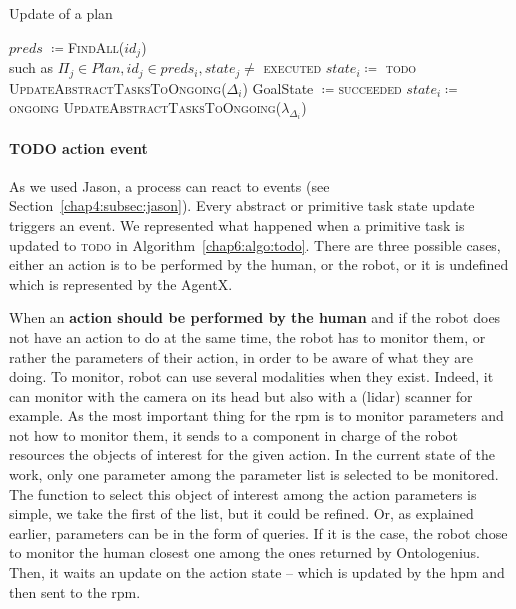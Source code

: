 \documentclass[a4paper,11pt,twoside]{StyleThese}
\begin{document}
\begin{algorithm}[!htb]
	\caption{Update of a plan}
	\label{chap6:algo:UP}
	\begin{algorithmic}
		\State $preds$ $\coloneqq$\textsc{FindAll}($id_j$) 
		\\\hfill such as $\Pi_j \in Plan, id_j \in preds_i,state_j\neq$ \textsc{executed} 
		\State $state_i\coloneqq$ \textsc{todo} 
		\State \textsc{UpdateAbstractTasksToOngoing($\Delta_i$)}
		\EndIf
		\EndFor
		\State GoalState $\coloneqq$\textsc{succeeded}
		\EndIf
		\EndFunction
		\Statex
		\State $state_i \coloneqq$ \textsc{ongoing} 
		\State \textsc{UpdateAbstractTasksToOngoing($\lambda_{\Delta_i}$)}
		\EndIf
		\EndFunction
	\end{algorithmic}
\end{algorithm}

\paragraph{TODO action event}
As we used Jason, a process can react to events (see Section~\ref{chap4:subsec:jason}). Every abstract or primitive task state update triggers an event. We represented what happened when a primitive task is updated to \textsc{todo} in Algorithm~\ref{chap6:algo:todo}. There are three possible cases, either an action is to be performed by the human, or the robot, or it is undefined which is represented by the AgentX. 

When an \textbf{action should be performed by the human} and if the robot does not have an action to do at the same time, the robot has to monitor them, or rather the parameters of their action, in order to be aware of what they are doing. To monitor, robot can use several modalities when they exist. Indeed, it can monitor with the camera on its head but also with a (lidar) scanner for example. As the most important thing for the \acrshort{rpm} is to monitor parameters and not how to monitor them, it sends to a component in charge of the robot resources the objects of interest for the given action. In the current state of the work, only one parameter among the parameter list is selected to be monitored. The function to select this object of interest among the action parameters is simple, we take the first of the list, but it could be refined. Or, as explained earlier, parameters can be in the form of \sparql{} queries. If it is the case, the robot chose to monitor the human closest one among the ones returned by Ontologenius. Then, it waits an update on the action state -- which is updated by the \acrfull{hpm} and then sent to the \acrshort{rpm}.
\end{document}
